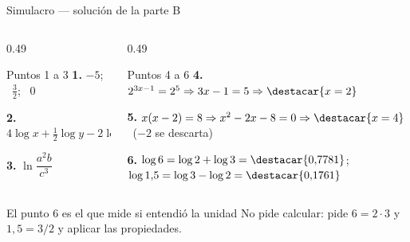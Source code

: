 \documentclass[aspectratio=169,10pt]{beamer}
\begin{document}
\begin{frame}{Simulacro — solución de la parte B}
  \scriptsize
  \begin{columns}[T,onlytextwidth]
    \begin{column}{0.49\textwidth}
      \begin{block}{Puntos 1 a 3}
        \tiny
        \textbf{1.} $-5$; \ $\tfrac{3}{2}$; \ $0$

        \vspace{0.08cm}
        \textbf{2.} $4\log x + \tfrac{1}{2}\log y - 2\log z$

        \vspace{0.08cm}
        \textbf{3.} $\ln\dfrac{a^{2}b}{c^{3}}$
      \end{block}
    \end{column}
    \begin{column}{0.49\textwidth}
      \begin{block}{Puntos 4 a 6}
        \tiny
        \textbf{4.} $2^{3x-1}=2^{5} \Rightarrow 3x-1=5 \Rightarrow
        \destacar{x=2}$

        \vspace{0.08cm}
        \textbf{5.} $x(x-2)=8 \Rightarrow x^2-2x-8=0 \Rightarrow
        \destacar{x=4}$ \ ($-2$ se descarta)

        \vspace{0.08cm}
        \textbf{6.} $\log 6 = \log 2+\log 3 = \destacar{0{,}7781}$; \\
        $\log 1{,}5 = \log 3-\log 2 = \destacar{0{,}1761}$
      \end{block}
    \end{column}
  \end{columns}

  \vspace{0.05cm}
  \begin{alertblock}{El punto 6 es el que mide si entendió la unidad}
    \tiny
    No pide calcular: pide  $6 = 2\cdot 3$ y
    $1{,}5 = 3/2$ y aplicar las propiedades. 
  \end{alertblock}
\end{frame}
\end{document}
